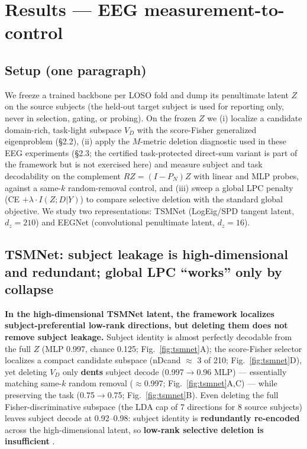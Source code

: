 \section{Results --- EEG measurement-to-control}

\subsection{Setup (one paragraph)}
We freeze a trained backbone per LOSO fold and dump its penultimate latent $Z$ on the source subjects (the
held-out target subject is used for reporting only, never in selection, gating, or probing). On the frozen
$Z$ we (i) localize a candidate domain-rich, task-light subspace $V_D$ with the score-Fisher generalized
eigenproblem (\S2.2), (ii) apply the $M$-metric deletion diagnostic used in these EEG experiments (\S2.3; the certified
task-protected direct-sum variant is part of the framework but is not exercised here) and measure subject and
task decodability on the complement $RZ=(I-P_N)Z$ with linear and MLP probes, against a same-$k$ random-removal
control, and (iii) sweep a global LPC penalty (CE $+ \lambda \cdot I(Z;D|Y)$) to compare selective deletion with the
standard global objective. We study two representations: TSMNet (LogEig/SPD tangent latent, $d_z=210$) and
EEGNet (convolutional penultimate latent, $d_z=16$).

\subsection{TSMNet: subject leakage is high-dimensional and redundant; global LPC ``works'' only by collapse}
\textbf{In the high-dimensional TSMNet latent, the framework localizes subject-preferential low-rank directions,
but deleting them does not remove subject leakage.} Subject identity is almost perfectly decodable from
the full $Z$ (MLP 0.997, chance 0.125; Fig.~\ref{fig:tsmnet}A); the score-Fisher selector localizes a compact candidate
subspace (nDcand $\approx$ 3 of 210; Fig.~\ref{fig:tsmnet}D), yet deleting $V_D$ only \textbf{dents} subject decode (0.997$\to$0.96 MLP) ---
essentially matching same-$k$ random removal ($\approx$0.997; Fig.~\ref{fig:tsmnet}A,C) --- while preserving the task (0.75$\to$0.75;
Fig.~\ref{fig:tsmnet}B). Even deleting the full Fisher-discriminative subspace (the LDA cap of 7 directions for 8 source
subjects) leaves subject decode at 0.92--0.98: subject identity is \textbf{redundantly re-encoded} across the
high-dimensional latent, so \textbf{low-rank selective deletion is insufficient} .

